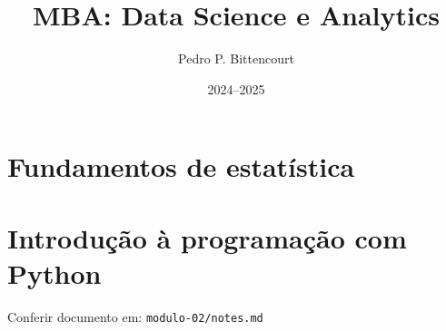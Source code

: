 \documentclass[twoside]{report}
\title{MBA: Data Science e Analytics}
\author{Pedro P. Bittencourt}
\date{2024--2025}
\begin{document}
\maketitle

\tableofcontents
\newpage

\chapter{Fundamentos de estatística}%
\label{cha:fund-estatistica}






\chapter{Introdução à programação com Python}%
\label{cha:intro-python}

Conferir documento em: \texttt{modulo-02/notes.md}

\printbibliography[title=Referências]
\listoftodos[Notas]
\end{document}
